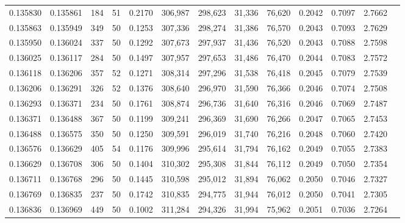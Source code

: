 \begin{tabular}{rrrrrrrrrrrrr}
0.135830 & 0.135861 &   184 &  51 &                                     0.2170 & 306,987 & 298,623 &  31,336 &  76,620 & 0.2042 & 0.7097 & 2.7662 \\
0.135863 & 0.135949 &   349 &  50 &                                     0.1253 & 307,336 & 298,274 &  31,386 &  76,570 & 0.2043 & 0.7093 & 2.7629 \\
0.135950 & 0.136024 &   337 &  50 &                                     0.1292 & 307,673 & 297,937 &  31,436 &  76,520 & 0.2043 & 0.7088 & 2.7598 \\
0.136025 & 0.136117 &   284 &  50 &                                     0.1497 & 307,957 & 297,653 &  31,486 &  76,470 & 0.2044 & 0.7083 & 2.7572 \\
0.136118 & 0.136206 &   357 &  52 &                                     0.1271 & 308,314 & 297,296 &  31,538 &  76,418 & 0.2045 & 0.7079 & 2.7539 \\
0.136206 & 0.136291 &   326 &  52 &                                     0.1376 & 308,640 & 296,970 &  31,590 &  76,366 & 0.2046 & 0.7074 & 2.7508 \\
0.136293 & 0.136371 &   234 &  50 &                                     0.1761 & 308,874 & 296,736 &  31,640 &  76,316 & 0.2046 & 0.7069 & 2.7487 \\
0.136371 & 0.136488 &   367 &  50 &                                     0.1199 & 309,241 & 296,369 &  31,690 &  76,266 & 0.2047 & 0.7065 & 2.7453 \\
0.136488 & 0.136575 &   350 &  50 &                                     0.1250 & 309,591 & 296,019 &  31,740 &  76,216 & 0.2048 & 0.7060 & 2.7420 \\
0.136576 & 0.136629 &   405 &  54 &                                     0.1176 & 309,996 & 295,614 &  31,794 &  76,162 & 0.2049 & 0.7055 & 2.7383 \\
0.136629 & 0.136708 &   306 &  50 &                                     0.1404 & 310,302 & 295,308 &  31,844 &  76,112 & 0.2049 & 0.7050 & 2.7354 \\
0.136711 & 0.136768 &   296 &  50 &                                     0.1445 & 310,598 & 295,012 &  31,894 &  76,062 & 0.2050 & 0.7046 & 2.7327 \\
0.136769 & 0.136835 &   237 &  50 &                                     0.1742 & 310,835 & 294,775 &  31,944 &  76,012 & 0.2050 & 0.7041 & 2.7305 \\
0.136836 & 0.136969 &   449 &  50 &                                     0.1002 & 311,284 & 294,326 &  31,994 &  75,962 & 0.2051 & 0.7036 & 2.7264 \\

\end{tabular}
